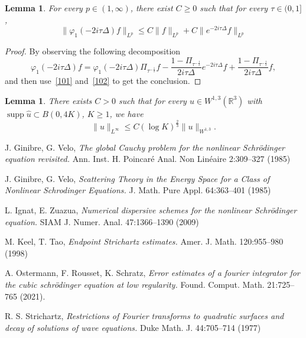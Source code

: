 \documentclass[10pt,a4paper]{article}
\newtheorem{lemma}[theorem]{Lemma}
\DeclareMathOperator{\supp}{supp}
\begin{document}
  \begin{lemma}
    For every \(p \in (1,\infty)\), there exist \(C \geq 0\) such that for every 
    \(\tau \in (0,1]\),
    \begin{equation}\label{decomp}
      \|\varphi_1(-2i\tau\Delta) f\|_{L^p} \leq C \|f\|_{L^p} + C
      \|e^{-2i\tau\Delta}f\|_{L^p}
    \end{equation}
  \end{lemma}

  \begin{proof}
    By observing the following decomposition 
    \begin{equation}\label{phi1decomp}
      \varphi_1(-2i\tau\Delta) f = \varphi_1(-2i\tau\Delta)\Pi_{\tau^{-\frac12}} f
      - \frac{1 - \Pi_{\tau^{-\frac12}}}{2i\tau\Delta} e^{-2i\tau\Delta} f 
      + \frac{1 - \Pi_{\tau^{-\frac12}}}{2i\tau\Delta} f,
    \end{equation}
    and then use~\eqref{101} and~\eqref{102} to get the conclusion.
  \end{proof}

  \begin{lemma}\label{sobbord}
    There exists \(C>0\) such that for every \(u\in W^{1,3}(\mathbb R^3)\) with
    \(\supp \hat{u} \subset B(0,4K)\), \(K \geq 1\), we have
    \[ \|u\|_{L^\infty} \leq C (\log K)^\frac23 \|u\|_{W^{1,3}}. \]
  \end{lemma}

  \begin{thebibliography}{99}
      {\rm J. Ginibre, G. Velo,}
      {\em The global Cauchy problem for the nonlinear Schr\"odinger equation revisited.}
      Ann. Inst. H. Poincar\'e Anal. Non Lin\'eaire 2:309--327 (1985)

      {\rm J. Ginibre, G. Velo,}
      {\em Scattering Theory in the Energy Space for a Class of Nonlinear Schrodinger Equations.}
      J. Math. Pure Appl. 64:363--401 (1985)

      {\rm L. Ignat, E. Zuazua,}
      {\em Numerical dispersive schemes for the nonlinear Schr\"odinger equation.}
      SIAM J. Numer. Anal. 47:1366--1390 (2009)

      {\rm M. Keel, T. Tao,}
      {\em Endpoint Strichartz estimates.}
      Amer. J. Math. 120:955--980 (1998)

      {\rm A. Ostermann, F. Rousset, K. Schratz,}
      {\em Error estimates of a fourier integrator for the cubic schr\"odinger equation at low regularity.}
      Found. Comput. Math. 21:725--765 (2021).

      {\rm R. S. Strichartz,}
      {\em Restrictions of Fourier transforms to quadratic surfaces and decay of solutions of wave equations.}
      Duke Math. J. 44:705--714 (1977)
  \end{thebibliography}
\end{document}
